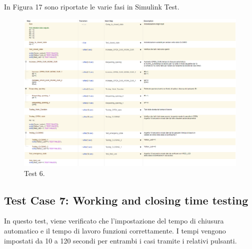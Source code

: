 \documentclass[12pt]{article}
\begin{document}
In Figura 17 sono riportate le varie fasi in Simulink Test.
\begin{figure}[H]
    
    \hspace{-2.3cm} %
    \includegraphics[width=1.3\textwidth]{Immagini_Test/Test_6_img.PNG}
    \caption{Test 6.}
    \label{fig:Test_6}
\end{figure}
\newpage
\subsection{Test Case 7: Working and closing time testing}
In questo test, viene verificato che l'impostazione del tempo di chiusura automatico e il tempo di lavoro funzioni correttamente. I tempi vengono impostati da 10 a 120 secondi per entrambi i casi tramite i relativi pulsanti.
\end{document}
